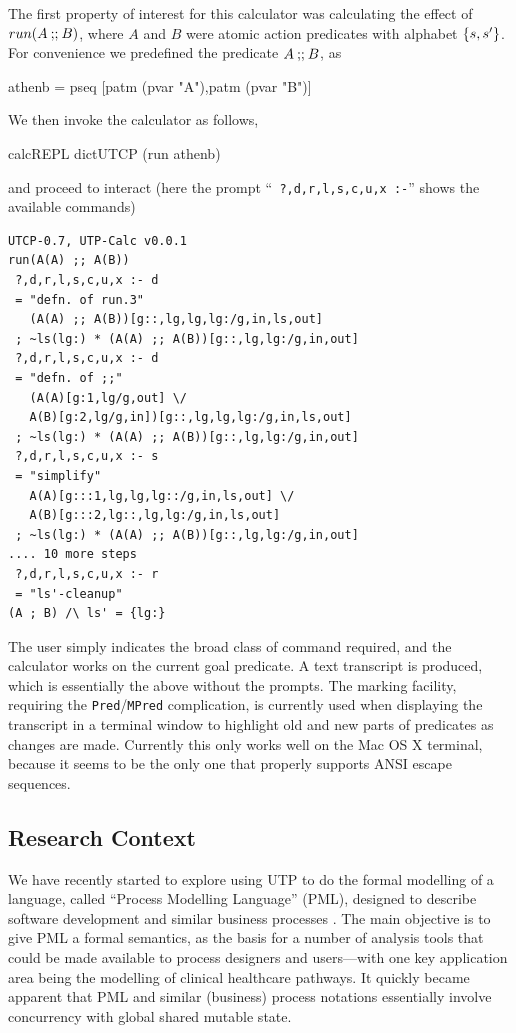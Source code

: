 The first property of interest for this calculator
was calculating the effect of $run(A \mathbin{\mathbf{;\!;}} B)$,
where $A$ and $B$ were atomic action predicates with alphabet $\{{s,s'}\}$.
For convenience we predefined the predicate $A \mathbin{\mathbf{;\!;}} B$, as
\begin{code}
athenb = pseq [patm (pvar "A"),patm (pvar "B")]
\end{code}
We then invoke the calculator as follows,
\begin{code}
calcREPL dictUTCP (run athenb)
\end{code}
and proceed to interact
(here the prompt  ``\texttt{ ?,d,r,l,s,c,u,x :-}''
shows the available commands)
\begin{verbatim}
UTCP-0.7, UTP-Calc v0.0.1
run(A(A) ;; A(B))
 ?,d,r,l,s,c,u,x :- d
 = "defn. of run.3"
   (A(A) ;; A(B))[g::,lg,lg,lg:/g,in,ls,out]
 ; ~ls(lg:) * (A(A) ;; A(B))[g::,lg,lg:/g,in,out]
 ?,d,r,l,s,c,u,x :- d
 = "defn. of ;;"
   (A(A)[g:1,lg/g,out] \/
   A(B)[g:2,lg/g,in])[g::,lg,lg,lg:/g,in,ls,out]
 ; ~ls(lg:) * (A(A) ;; A(B))[g::,lg,lg:/g,in,out]
 ?,d,r,l,s,c,u,x :- s
 = "simplify"
   A(A)[g:::1,lg,lg,lg::/g,in,ls,out] \/
   A(B)[g:::2,lg::,lg,lg:/g,in,ls,out]
 ; ~ls(lg:) * (A(A) ;; A(B))[g::,lg,lg:/g,in,out]
.... 10 more steps
 ?,d,r,l,s,c,u,x :- r
 = "ls'-cleanup"
(A ; B) /\ ls' = {lg:}
\end{verbatim}
The user simply indicates the broad class of command required,
and the calculator works on the current goal predicate.
A text transcript is produced,
which is essentially the above
without the prompts.
The marking facility, requiring the \texttt{Pred}/\texttt{MPred} complication,
is currently used when displaying the transcript in a terminal
window to highlight old and new parts of predicates as changes are made.
Currently this only works well on the Mac OS X terminal,
because it seems to be the only one that properly supports ANSI escape sequences.

\subsection{Research Context}\label{ssec:context}

We have recently started to explore using UTP
to do the  formal modelling of a language,
called ``Process Modelling Language'' (PML),
designed to describe software development and similar business
processes \cite{DBLP:journals/infsof/AtkinsonWN07}.
The main objective is to give PML a formal semantics,
as the basis for a number of analysis tools that could be made available
to process designers and users---with one key application
area being the modelling of clinical healthcare pathways.
It quickly became apparent that PML and similar (business) process
notations essentially involve concurrency with global shared mutable state.

